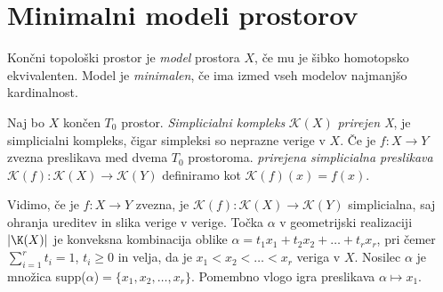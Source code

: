 \documentclass[mat1]{fmfdelo}
\begin{document}

   
\section{Minimalni modeli prostorov}\label{sec:minimal}

\begin{definicija}
    Končni topološki prostor je \textit{model} prostora $X$, če mu je šibko homotopsko ekvivalenten. Model je \textit{minimalen}, če ima izmed vseh modelov najmanjšo kardinalnost.
\end{definicija}


\begin{definicija}
    Naj bo $X$ končen $T_0$ prostor. \textit{Simplicialni kompleks} $\mathcal{K}(X)$ \textit{prirejen X}, je simplicialni kompleks, čigar simpleksi so neprazne verige v $X$. Če je $f: X\rightarrow Y$ zvezna preslikava med dvema $T_0$ prostoroma. \textit{prirejena simplicialna preslikava} $\mathcal{K}(f):\mathcal{K}(X) \rightarrow \mathcal{K}(Y)$ definiramo kot $\mathcal{K}(f)(x) = f(x)$.
\end{definicija}
Vidimo, če je $f: X\rightarrow Y$ zvezna, je $\mathcal{K}(f):\mathcal{K}(X) \rightarrow \mathcal{K}(Y)$ simplicialna, saj ohranja ureditev in slika verige v verige.
Točka $\alpha$ v geometrijski realizaciji $|\K(X)|$ je
konveksna kombinacija oblike
$\alpha = t_1x_1+t_2x_2 + \ldots + t_r x_r$, pri čemer 
$\sum_{i=1}^{r}t_i=1$, $t_i \ge 0$ in 
velja, da je $x_1 < x_2 < \ldots < x_r$ veriga v $X$.
Nosilec $\alpha$ je množica supp($\alpha$)$= \{x_1,x_2,\ldots,x_r\}$. Pomembno vlogo igra 
 preslikava $\alpha \mapsto x_1$.
 
\end{document}
